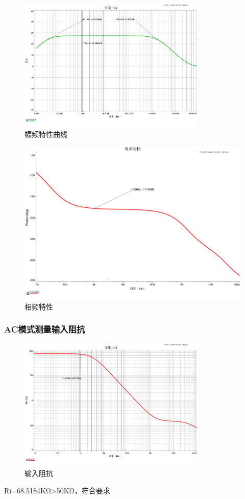 \documentclass[a4paper]{article}
\theoremstyle{definition}
\theoremstyle{plain}
\theoremstyle{remark}
\begin{document}
\begin{figure}[H]
	\centering
	\includegraphics[width=0.8\textwidth]{幅频特性曲线}
	\caption{幅频特性曲线}
	\label{幅频特性曲线}
\end{figure}
\begin{figure}[H]
	\centering
	\includegraphics[width=1\textwidth]{相频特性}
	\caption{相频特性}
	\label{相频特性}
\end{figure}
\subsubsection{AC模式测量输入阻抗}
\begin{figure}[H]
	\centering
	\includegraphics[width=0.8\textwidth]{输入阻抗}
	\caption{输入阻抗}
	\label{输入阻抗}
\end{figure}
Ri=68.5184KΩ>50KΩ，符合要求
\end{document}

